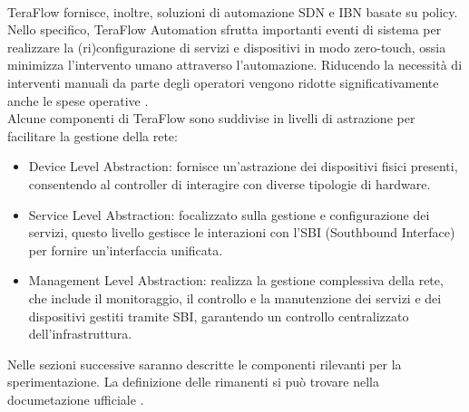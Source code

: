 \\TeraFlow fornisce, inoltre, soluzioni di automazione SDN e IBN basate su policy. Nello specifico, TeraFlow Automation sfrutta 
importanti eventi di sistema per realizzare la (ri)configurazione di servizi e dispositivi in modo zero-touch, ossia minimizza l'intervento umano attraverso l'automazione.
Riducendo la necessità di interventi manuali da parte degli operatori vengono ridotte significativamente anche le spese operative \cite{Component}.
\\Alcune componenti di TeraFlow sono suddivise in livelli di astrazione per facilitare la gestione della rete:
\begin{itemize}
\item Device Level Abstraction: fornisce un'astrazione dei dispositivi fisici presenti, consentendo al controller di interagire con diverse tipologie di hardware.
\item Service Level Abstraction: focalizzato sulla gestione e configurazione dei servizi, questo livello gestisce le interazioni con l'SBI (Southbound Interface) per fornire un'interfaccia unificata.
\item Management Level Abstraction: realizza la gestione complessiva della rete, che include il monitoraggio, il controllo e la manutenzione dei servizi e dei dispositivi gestiti tramite SBI, garantendo un controllo centralizzato dell'infrastruttura.
\end{itemize}
Nelle sezioni successive saranno descritte le componenti rilevanti per la sperimentazione.
La definizione delle rimanenti si può trovare nella documetazione ufficiale \cite{D32}. 

